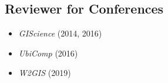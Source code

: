 \documentclass[11pt, a4paper]{article}
\begin{document}
\subsection*{Reviewer for Conferences}
\begin{itemize}
  \setlength\itemsep{0em}
  \item \emph{GIScience} (2014, 2016)
  \item \emph {UbiComp} (2016)
  \item \emph {W2GIS} (2019)
\end{itemize}
\vfill{}


%
%
%
%
%
\end{document}
